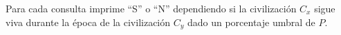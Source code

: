 \outputText

Para cada consulta imprime ``S'' o ``N'' dependiendo si la civilización $C_x$ sigue viva durante la época de la civilización $C_y$ dado un porcentaje umbral de $P$.

\exampleCases

\begin{example}
\end{example}

